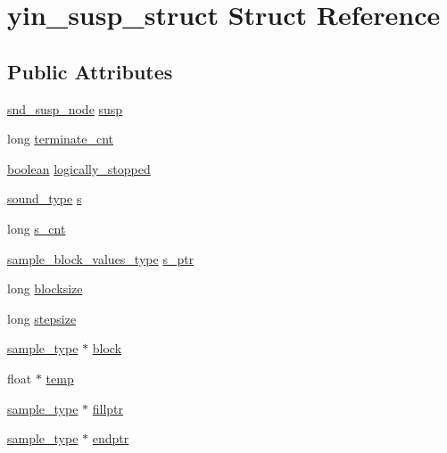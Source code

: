\hypertarget{structyin__susp__struct}{}\section{yin\+\_\+susp\+\_\+struct Struct Reference}
\label{structyin__susp__struct}
\subsection*{Public Attributes}
\begin{DoxyCompactItemize}
\item 
\hyperlink{sound_8h_a6b268203688a934bd798ceb55f85d4c0}{snd\+\_\+susp\+\_\+node} \hyperlink{structyin__susp__struct_a8eea450d2a654417e8e07eb4f5f9ae4c}{susp}
\item 
long \hyperlink{structyin__susp__struct_ae0dc53f4b8e251a1e1e2ba540151f221}{terminate\+\_\+cnt}
\item 
\hyperlink{cext_8h_a7670a4e8a07d9ebb00411948b0bbf86d}{boolean} \hyperlink{structyin__susp__struct_abeef0ed483d9b85ddf4c02d2cff8bcec}{logically\+\_\+stopped}
\item 
\hyperlink{sound_8h_a792cec4ed9d6d636d342d9365ba265ea}{sound\+\_\+type} \hyperlink{structyin__susp__struct_a8877982a4c335caab398bee5f8c71e33}{s}
\item 
long \hyperlink{structyin__susp__struct_a0747b5cf407ffb737710d97e9b6b4711}{s\+\_\+cnt}
\item 
\hyperlink{sound_8h_a83d17f7b465d1591f27cd28fc5eb8a03}{sample\+\_\+block\+\_\+values\+\_\+type} \hyperlink{structyin__susp__struct_ab60761876663def5eeccb88c03ae4f50}{s\+\_\+ptr}
\item 
long \hyperlink{structyin__susp__struct_a1e8feb96618ed3cab2833b3babfadfc4}{blocksize}
\item 
long \hyperlink{structyin__susp__struct_aca4a51a1b0e6e15fef714eb6ddc3e287}{stepsize}
\item 
\hyperlink{sound_8h_a3a9d1d4a1c153390d2401a6e9f71b32c}{sample\+\_\+type} $\ast$ \hyperlink{structyin__susp__struct_a8c97a26cf5ab9530883a11d0d4c2e381}{block}
\item 
float $\ast$ \hyperlink{structyin__susp__struct_aefb3a784c4e0854229044f3d45bd613e}{temp}
\item 
\hyperlink{sound_8h_a3a9d1d4a1c153390d2401a6e9f71b32c}{sample\+\_\+type} $\ast$ \hyperlink{structyin__susp__struct_ad56f64c1188c8aa9843a54fde58af580}{fillptr}
\item 
\hyperlink{sound_8h_a3a9d1d4a1c153390d2401a6e9f71b32c}{sample\+\_\+type} $\ast$ \hyperlink{structyin__susp__struct_a1f3f6f61101e12c8f81bcf7381c68e0d}{endptr}

\end{DoxyCompactItemize}
